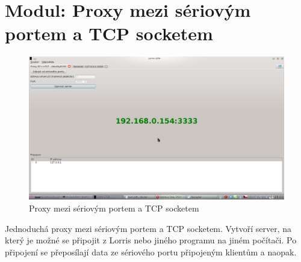 \documentclass[12pt, a4paper, oneside]{article}
\begin{document}
\newpage
\setlength{\voffset}{0mm} %
\pagestyle{plain}

\section{Modul: Proxy mezi sériovým portem a TCP socketem}
\begin{figure}[H]
\begin{center}
\includegraphics[width=\textwidth]{img/proxy.png}
\caption{Proxy mezi sériovým portem a TCP socketem}
\label{Shupito}
\end{center}
\end{figure}
Jednoduchá proxy mezi sériovým portem a TCP socketem. Vytvoří server, na který je možné se připojit z Lorris nebo jiného programu na jiném počítači. Po připojení se přeposílají data ze sériového portu připojeným klientům a naopak.

\newpage
\setlength{\voffset}{0mm} %
\pagestyle{plain}
\end{document}
